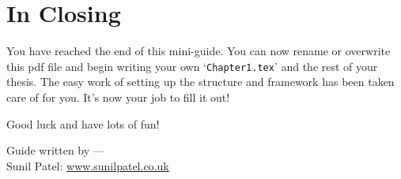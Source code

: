 
\section{In Closing}

You have reached the end of this mini-guide. You can now rename or overwrite this pdf file and begin writing your own `\texttt{Chapter1.tex}' and the rest of your thesis. The easy work of setting up the structure and framework has been taken care of for you. It's now your job to fill it out!

Good luck and have lots of fun!

\begin{flushright}
Guide written by ---\\
Sunil Patel: \href{http://www.sunilpatel.co.uk}{www.sunilpatel.co.uk}
\end{flushright}
